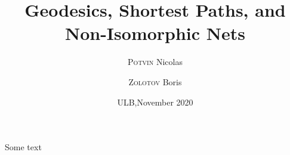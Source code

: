\documentclass[a4paper,11pt]{article}
\title{Geodesics, Shortest Paths, and Non-Isomorphic Nets}
\author{{\scshape Potvin} Nicolas \and {\scshape Zolotov} Boris}
\date{ULB,\quad November 2020}
\begin{document}
 \maketitle

Some text



 
\end{document}
